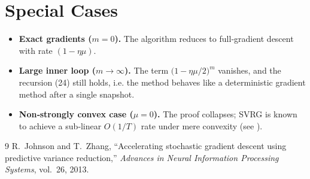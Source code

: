 \documentclass[11pt]{article}
\begin{document}
\section*{Special Cases}
\begin{itemize}
\item \textbf{Exact gradients ($m=0$).} The algorithm reduces to full‑gradient descent with rate $(1-\eta\mu)$.
\item \textbf{Large inner loop ($m\to\infty$).} The term $\bigl(1-\eta\mu/2\bigr)^{m}$ vanishes, and the recursion (24) still holds, i.e. the method behaves like a deterministic gradient method after a single snapshot.
\item \textbf{Non‑strongly convex case ($\mu=0$).} The proof collapses; SVRG is known to achieve a sub‑linear $O(1/T)$ rate under mere convexity (see \cite{johnson2013accelerating}).
\end{itemize}

\begin{thebibliography}{9}
R.~Johnson and T.~Zhang, ``Accelerating stochastic gradient descent using
  predictive variance reduction,'' \emph{Advances in Neural Information
  Processing Systems}, vol.~26, 2013.
\end{thebibliography}
\end{document}
